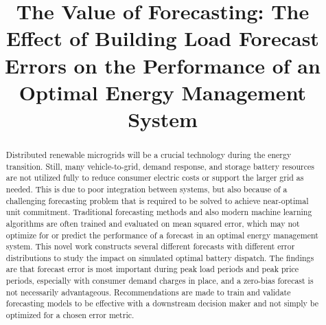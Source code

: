 \documentclass[conference]{IEEEtran}
\begin{document}
\title{The Value of Forecasting: The Effect of Building Load Forecast Errors on the Performance of an Optimal Energy Management System}

\author{
\and
{}
\and
{}
}

\maketitle

\begin{abstract}
    Distributed renewable microgrids will be a crucial technology during the energy transition. Still, many vehicle-to-grid, demand response, and storage battery resources are not utilized fully to reduce consumer electric costs or support the larger grid as needed. This is due to poor integration between systems, but also because of a challenging forecasting problem that is required to be solved to achieve near-optimal unit commitment. Traditional forecasting methods and also modern machine learning algorithms are often trained and evaluated on mean squared error, which may not optimize for or predict the performance of a forecast in an optimal energy management system. This novel work constructs several different forecasts with different error distributions to study the impact on simulated optimal battery dispatch. The findings are that forecast error is most important during peak load periods and peak price periods, especially with consumer demand charges in place, and a zero-bias forecast is not necessarily advantageous. Recommendations are made to train and validate forecasting models to be effective with a downstream decision maker and not simply be optimized for a chosen error metric.
    \end{abstract}
\end{document}
